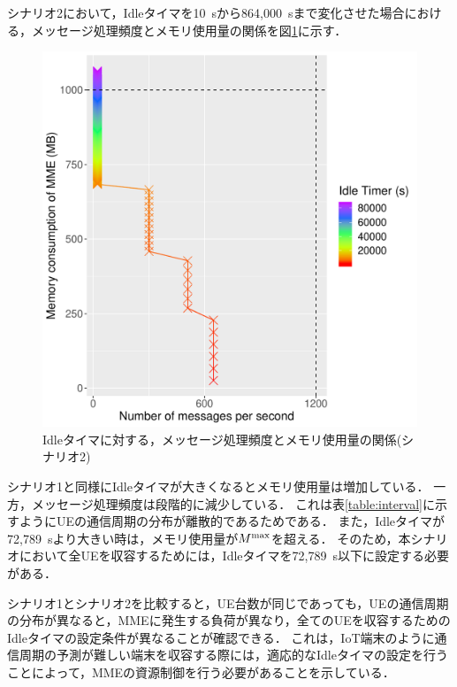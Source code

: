 \documentclass[technicalreport]{ieicej-rev}
\begin{document}
シナリオ2において，Idleタイマを10~sから864,000~sまで変化させた場合における，メッセージ処理頻度とメモリ使用量の関係を図\ref{theory_2_all_300s_theory}に示す．
\begin{figure}[!t]
  \centering
  \includegraphics[width=1\hsize]{theory_2_all_300s_theory.pdf}
  \caption{Idleタイマに対する，メッセージ処理頻度とメモリ使用量の関係(シナリオ2)}
  \label{theory_2_all_300s_theory}
\end{figure}
シナリオ1と同様にIdleタイマが大きくなるとメモリ使用量は増加している．
一方，メッセージ処理頻度は段階的に減少している．
これは表\ref{table:interval}に示すようにUEの通信周期の分布が離散的であるためである．
また，Idleタイマが72,789~sより大きい時は，メモリ使用量が$M^{\rm max}$を超える．
そのため，本シナリオにおいて全UEを収容するためには，Idleタイマを72,789~s以下に設定する必要がある．

シナリオ1とシナリオ2を比較すると，UE台数が同じであっても，UEの通信周期の分布が異なると，MMEに発生する負荷が異なり，全てのUEを収容するためのIdleタイマの設定条件が異なることが確認できる．
これは，IoT端末のように通信周期の予測が難しい端末を収容する際には，適応的なIdleタイマの設定を行うことによって，MMEの資源制御を行う必要があることを示している．
\end{document}
